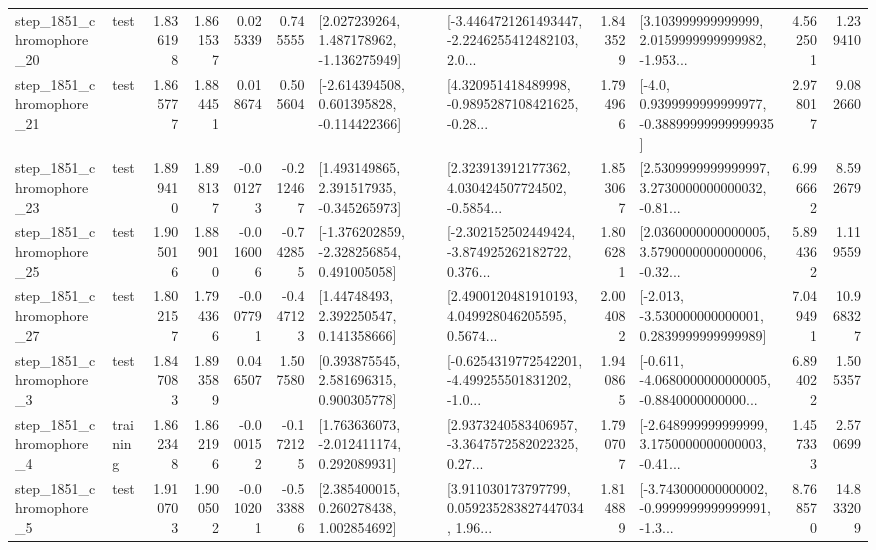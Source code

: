 \begin{tabular}{llrrrrllrlrr}
 step\_1851\_chromophore\_20 &      test &      1.836198 &    1.861537 &      0.025339 &  0.745555 &    [2.027239264, 1.487178962, -1.136275949] &  [-3.4464721261493447, -2.2246255412482103, 2.0... &       1.843529 &  [3.103999999999999, 2.0159999999999982, -1.953... &            4.562501 &          1.239410 \\
 step\_1851\_chromophore\_21 &      test &      1.865777 &    1.884451 &      0.018674 &  0.505604 &   [-2.614394508, 0.601395828, -0.114422366] &  [4.320951418489998, -0.9895287108421625, -0.28... &       1.794966 &   [-4.0, 0.9399999999999977, -0.38899999999999935] &            2.978017 &          9.082660 \\
 step\_1851\_chromophore\_23 &      test &      1.899410 &    1.898137 &     -0.001273 & -0.212467 &    [1.493149865, 2.391517935, -0.345265973] &  [2.323913912177362, 4.030424507724502, -0.5854... &       1.853067 &  [2.5309999999999997, 3.2730000000000032, -0.81... &            6.996662 &          8.592679 \\
 step\_1851\_chromophore\_25 &      test &      1.905016 &    1.889010 &     -0.016006 & -0.742855 &   [-1.376202859, -2.328256854, 0.491005058] &  [-2.302152502449424, -3.874925262182722, 0.376... &       1.806281 &  [2.0360000000000005, 3.5790000000000006, -0.32... &            5.894362 &          1.119559 \\
 step\_1851\_chromophore\_27 &      test &      1.802157 &    1.794366 &     -0.007791 & -0.447123 &      [1.44748493, 2.392250547, 0.141358666] &  [2.4900120481910193, 4.049928046205595, 0.5674... &       2.004082 &   [-2.013, -3.530000000000001, 0.2839999999999989] &            7.049491 &         10.968327 \\
  step\_1851\_chromophore\_3 &      test &      1.847083 &    1.893589 &      0.046507 &  1.507580 &     [0.393875545, 2.581696315, 0.900305778] &  [-0.6254319772542201, -4.499255501831202, -1.0... &       1.940865 &  [-0.611, -4.0680000000000005, -0.8840000000000... &            6.894022 &          1.505357 \\
  step\_1851\_chromophore\_4 &  training &      1.862348 &    1.862196 &     -0.000152 & -0.172125 &    [1.763636073, -2.012411174, 0.292089931] &  [2.9373240583406957, -3.3647572582022325, 0.27... &       1.790707 &  [-2.648999999999999, 3.1750000000000003, -0.41... &            1.457333 &          2.570699 \\
  step\_1851\_chromophore\_5 &      test &      1.910703 &    1.900502 &     -0.010201 & -0.533886 &     [2.385400015, 0.260278438, 1.002854692] &  [3.911030173797799, 0.059235283827447034, 1.96... &       1.814889 &  [-3.743000000000002, -0.9999999999999991, -1.3... &            8.768570 &         14.833209 \\

\end{tabular}
